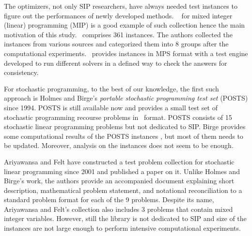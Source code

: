 The optimizers, not only SIP researchers, have always needed test instances to figure out the performances of newly developed methods. \miplib\ \cite{MIPLIB} for mixed integer (linear) programming (MIP) is a good example of such collection hence the main motivation of this study. \miplib\ comprises 361 instances. The authors collected the instances from various sources and categorized them into 8 groups after the computational experiments. \miplib\ provides instances in \textsf{MPS} format with a test engine developed to run different solvers in a defined way to check the answers for consistency. 

For stochastic programming, to the best of our knowledge, the first such approach is Holmes and Birge's \textit{portable stochastic programming test set} (POSTS) \cite{POSTS} since 1994. POSTS is still available now and provides a small test set of stochastic programming recourse problems in \smps\ format. POSTS consists of 15 stochastic linear programming problems but not dedicated to SIP. Birge provides some computational results of the POSTS instances \cite{POSTSresults}, but most of them needs to be updated. Moreover, analysis on the instances does not seem to be enough. 

Ariyawansa and Felt \cite{journal:AF2004} have constructed a test problem collection for stochastic linear programming since 2001 and published a paper on it. Unlike Holmes and Birge's work, the authors provide an accompanied document explaining short description, mathematical problem statement, and notational reconciliation to a standard problem format for each of the 9 problems. Despite its name, Ariyawansa and Felt's collection also includes 3 problems that contain mixed integer variables. However, still the library is not dedicated to SIP and size of the instances are not large enough to perform intensive computational experiments. 

